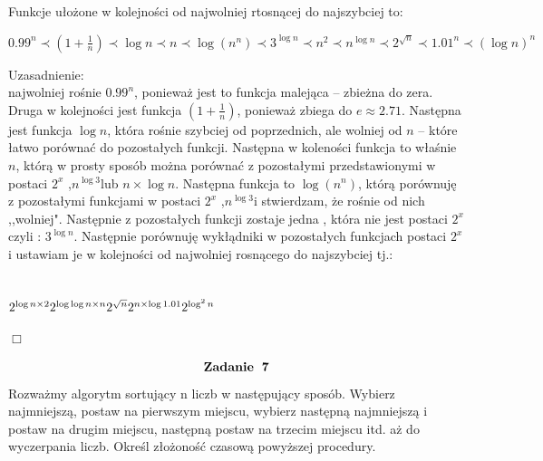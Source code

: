 \documentclass[fleqn]{article}
\begin{document}
Funkcje ułożone w kolejności od najwolniej rtosnącej do najszybciej to: \newline \newline
\begin{center}
$
0.99^{n} \prec (1 +\frac{1}{n} ) \prec \log n  \prec n \prec \log (n^{n})  \prec 3 ^ {\log n} \prec n^{2} \prec n^{\log n} \prec 2^{\sqrt{n}} 
\prec 1.01^{n} \prec  (\log n) ^{n} 
$
\end{center}
Uzasadnienie:\\
 najwolniej rośnie $ 0.99^{n} $, ponieważ jest to funkcja malejąca -- zbieżna do zera. Druga w kolejności jest funkcja $(1 +\frac{1}{n} )$, ponieważ zbiega do $e \approx 2.71 $. Następna jest funkcja $\log n $, która rośnie szybciej od poprzednich, ale wolniej od $n$ -- które łatwo porównać do pozostałych funkcji. Następna w koleności funkcja to właśnie $n$, którą w prosty sposób można porównać z pozostałymi przedstawionymi w postaci  $2^{x}$ ,$n ^{\log 3} $lub $n \times \log n$. Następna funkcja to $\log (n^{n}) $, którą porównuję z pozostałymi funkcjami w postaci   $2^{x}$ ,$n ^{\log 3} $i stwierdzam, że rośnie od nich ,,wolniej". Następnie z pozostałych funkcji zostaje jedna , która nie jest postaci $2^{x}$ czyli : $3 ^ {\log n}$. Następnie porównuję wykłądniki w pozostałych funkcjach postaci $2^{x}$ i ustawiam je w kolejności od najwolniej rosnącego  do najszybciej tj.: \\ \\ \\
 $
 2^{\log n \times 2} \newline\newline
 2^{\log \log n \times n} \newline\newline
 2^{\sqrt{n}} \newline\newline
 2^{n \times \log 1.01} \newline\newline
 2^{\log^{2} n} \newline\newline
 $
 \begin{flushright}
 $\Box$
 \end{flushright}
 \[\huge \bf Zadanie \ 7\] 
 Rozważmy algorytm sortujący n liczb w następujący sposób. Wybierz najmniejszą, postaw na pierwszym miejscu, wybierz następną najmniejszą i postaw na drugim miejscu, następną postaw na trzecim miejscu itd. aż do wyczerpania liczb. Określ złożoność czasową powyższej procedury.\\ \\ \\
\end{document}
